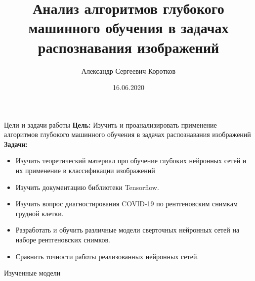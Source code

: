 \documentclass{beamer}
\title{Анализ алгоритмов глубокого машинного обучения  в задачах распознавания изображений}
\author[Коротков А.С.]{Александр Сергеевич Коротков}
\institute[]{Научный руководитель: Д.\,В.~Матвеев}
\date{16.06.2020}
\begin{document}
\maketitle
\begin{frame}{Цели и задачи работы}
    \textbf{Цель:} Изучить и проанализировать применение алгоритмов глубокого машинного обучения в задачах распознавания изображений \\
    \textbf{Задачи: }
    \begin{itemize}
        \item Изучить теоретический материал про обучение глубоких нейронных сетей и их применение в классификации изображений
        \item Изучить документацию библиотеки Tensorflow.
        \item Изучить вопрос диагностирования COVID-19 по рентгеновским снимкам грудной клетки.
        \item Разработать и обучить различные модели сверточных нейронных сетей на наборе рентгеновских снимков.
        \item Сравнить точности работы реализованных нейронных сетей.
    \end{itemize}
\end{frame}

\begin{frame}{Изученные модели}

    
\end{frame}
\end{document}
